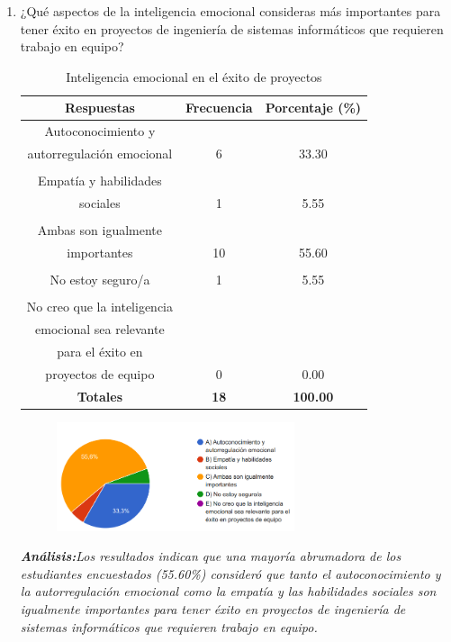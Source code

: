 \documentclass[journal]{IEEEtran}
\begin{document}
\begin{enumerate}
\item¿Qué aspectos de la inteligencia emocional consideras más importantes para tener éxito en proyectos de ingeniería de sistemas informáticos que requieren trabajo en equipo?
	\begin{table}[H]
		\renewcommand{\arraystretch}{1.3}
		\centering
		\caption{Inteligencia emocional en el éxito de proyectos}
		\begin{tabular}{c c c}
			\hline
			\textbf{Respuestas} & \textbf{Frecuencia} & \textbf{Porcentaje (\%)}\\
			\hline
			Autoconocimiento y \\autorregulación emocional  & 6 & 33.30 \\
			\\Empatía y habilidades \\sociales  & 1 & 5.55 \\
			\\Ambas son igualmente \\importantes  & 10 & 55.60\\
			\\No estoy seguro/a  & 1 & 5.55\\
			\\No creo que la inteligencia \\emocional sea relevante \\para el éxito en \\proyectos de equipo & 0 & 0.00\\
			\hline
			\textbf{Totales} &\textbf{18}& \textbf{100.00}\\
			\hline
		\end{tabular}
	\end{table}
	\begin{figure}[h]
		\centering
		\includegraphics[width=07cm]{Pregunta10}
	\end{figure}
	\textit{\textbf{Análisis:}Los resultados indican que una mayoría abrumadora de los estudiantes encuestados (55.60\%) consideró que tanto el autoconocimiento y la autorregulación emocional como la empatía y las habilidades sociales son igualmente importantes para tener éxito en proyectos de ingeniería de sistemas informáticos que requieren trabajo en equipo.
}
\end{enumerate}
\end{document}

